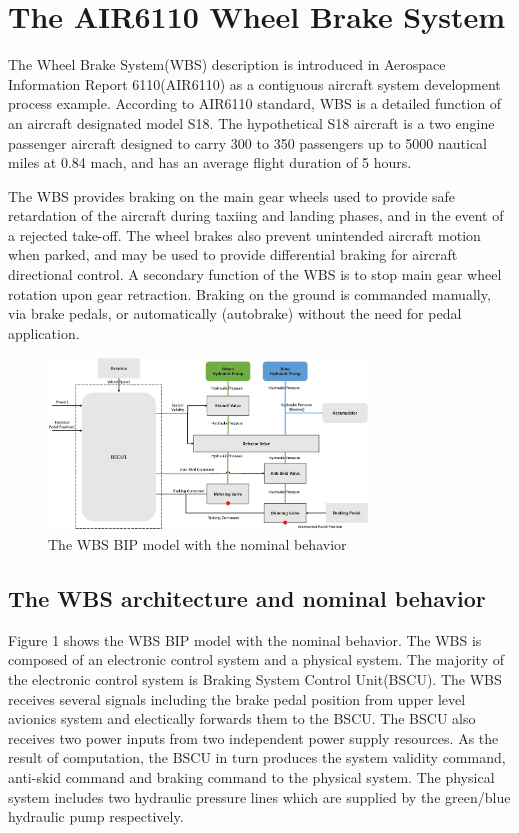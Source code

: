 

\section{The AIR6110 Wheel Brake System}

The Wheel Brake System(WBS) description is introduced in Aerospace Information Report 6110(AIR6110) as a contiguous aircraft system development process example. According to AIR6110 standard, WBS is a detailed function of an aircraft designated model S18. The hypothetical S18 aircraft is a two engine passenger aircraft designed to carry 300 to 350 passengers up to 5000 nautical miles at 0.84 mach, and has an average flight duration of 5 hours.

The WBS provides braking on the main gear wheels used to provide safe retardation of the aircraft during taxiing and landing phases, and in the event of a rejected take-off. The wheel brakes also prevent unintended aircraft motion when parked, and may be used to provide differential braking for aircraft directional control. A secondary function of the WBS is to stop main gear wheel rotation upon gear retraction. Braking on the ground is commanded manually, via brake pedals, or automatically (autobrake) without the need for pedal application.

\begin{figure}[htbp]
	\centerline{\includegraphics[width=85mm]{figure/Nominal.eps}}
	\caption{The WBS BIP model with the nominal behavior}
	\label{WBS_BIP_Nominal}
\end{figure}

\subsection{The WBS architecture and nominal behavior}

Figure 1 shows the WBS BIP model with the nominal behavior. The WBS is composed of an electronic control system and a physical system. The majority of the electronic control system is Braking System Control Unit(BSCU). The WBS receives several signals including the brake pedal position from upper level avionics system and electically forwards them to the BSCU. The BSCU also receives two power inputs from two independent power supply resources. As the result of computation, the BSCU in turn produces the system validity command, anti-skid command and braking command to the physical system. The physical system includes two hydraulic pressure lines which are supplied by the green/blue hydraulic pump respectively.

